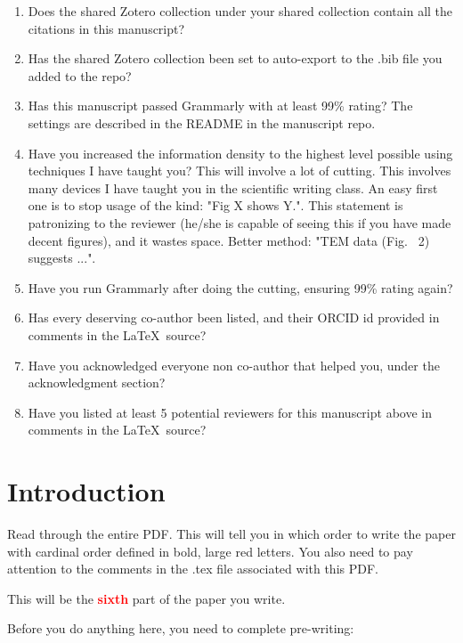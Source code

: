 \documentclass[12 pt]{article}
\begin{document}
{{\begin{enumerate}
\item Does the shared Zotero collection under your shared collection contain all the citations in this manuscript?
\item Has the shared Zotero collection been set to auto-export to the .bib file you added to the repo?
\item Has this manuscript passed Grammarly with at least 99\% rating? The settings are described in the README in the manuscript repo.
\item Have you increased the information density to the highest level possible using techniques I have taught you? This will involve a lot of cutting. This involves many devices I have taught you in the scientific writing class. An easy first one is to stop usage of the kind: "Fig X shows Y.". This statement is patronizing to the reviewer (he/she is capable of seeing this if you have made decent figures), and it wastes space. Better method: "TEM data (Fig.~ 2) suggests ...".
\item Have you run Grammarly after doing the cutting, ensuring 99\% rating again?
\item Has every deserving co-author been listed, and their ORCID id provided in comments in the \LaTeX\ source?
\item Have you acknowledged everyone non co-author that helped you, under the acknowledgment section?
\item Have you listed at least 5 potential reviewers for this manuscript above in comments in the \LaTeX\ source?
\end{enumerate}
}
}

  
\section{Introduction}
\label{sec:introduction}

Read through the entire PDF. This will tell you in which order to write the paper with cardinal order defined in bold, large red letters. You also need to pay attention to the comments in the .tex file associated with this PDF.

This will be the \textbf{\Huge \textcolor{red}{sixth}} part of the paper you write.

Before you do anything here, you need to complete pre-writing:
\end{document}
